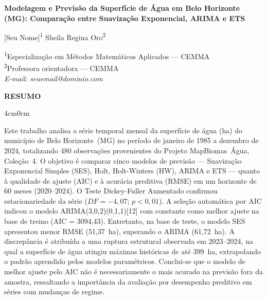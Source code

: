 \documentclass[12pt, a4paper]{article}
\begin{document}
\begin{center}
  {\large\textbf{Modelagem e Previsão da Superfície de Água em Belo Horizonte
  (MG): Comparação entre Suavização Exponencial, ARIMA e ETS}}

  \vspace{0.8em}

  {\normalsize [Seu Nome]\textsuperscript{1} \quad
               Sheila Regina Oro\textsuperscript{2}}

  \vspace{0.4em}

  {\small
  \textsuperscript{1}Especialização em Métodos Matemáticos Aplicados — CEMMA\\
  \textsuperscript{2}Professora orientadora — CEMMA\\[0.3em]
  \textit{E-mail: seuemail@dominio.com}
  }
\end{center}

\vspace{1em}

\begin{center}
  \textbf{RESUMO}
\end{center}
\begin{adjustwidth}{4cm}{0cm}
\begin{singlespace}
\small
Este trabalho analisa a série temporal mensal da superfície de água (ha) do
município de Belo Horizonte~(MG) no período de janeiro de 1985 a dezembro de
2024, totalizando 480 observações provenientes do Projeto MapBiomas~Água,
Coleção~4. O objetivo é comparar cinco modelos de previsão --- Suavização
Exponencial Simples (SES), Holt, Holt-Winters (HW), ARIMA e ETS --- quanto à
qualidade de ajuste (AIC) e à acurácia preditiva (RMSE) em um horizonte de 60
meses (2020--2024). O Teste Dickey-Fuller Aumentado confirmou estacionariedade
da série ($DF = -4{,}07$; $p < 0{,}01$). A seleção automática por AIC indicou
o modelo ARIMA(3,0,2)(0,1,1)[12] com constante como melhor ajuste na base de
treino (AIC = 3094,43). Entretanto, na base de teste, o modelo SES apresentou
menor RMSE (51,37~ha), superando o ARIMA (61,72~ha). A discrepância é
atribuída a uma ruptura estrutural observada em 2023--2024, na qual a
superfície de água atingiu máximas históricas de até 399~ha, extrapolando o
padrão aprendido pelos modelos paramétricos. Conclui-se que o modelo de melhor
ajuste pelo AIC não é necessariamente o mais acurado na previsão fora da
amostra, ressaltando a importância da avaliação por desempenho preditivo em
séries com mudanças de regime.
\end{singlespace}
\end{adjustwidth}
\end{document}

